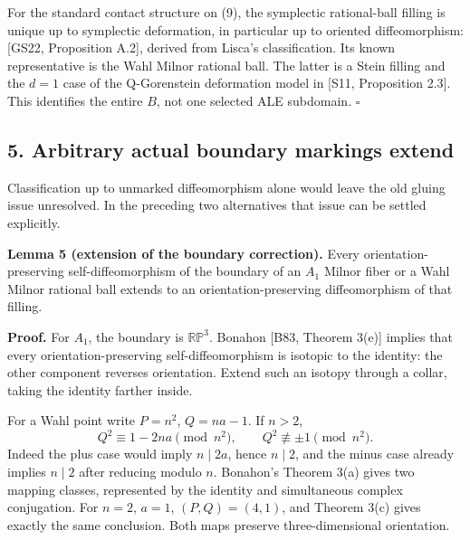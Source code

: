 \documentclass[
  11pt,
]{article}
\begin{document}
For the standard contact structure on (9), the symplectic rational-ball
filling is unique up to symplectic deformation, in particular up to
oriented diffeomorphism: {[}GS22, Proposition A.2{]}, derived from
Lisca's classification. Its known representative is the Wahl Milnor
rational ball. The latter is a Stein filling and the \(d=1\) case of the
Q-Gorenstein deformation model in {[}S11, Proposition 2.3{]}. This
identifies the entire \(B\), not one selected ALE subdomain. \(\square\)

\hypertarget{arbitrary-actual-boundary-markings-extend}{%
\subsection{5. Arbitrary actual boundary markings
extend}\label{arbitrary-actual-boundary-markings-extend}}

Classification up to unmarked diffeomorphism alone would leave the old
gluing issue unresolved. In the preceding two alternatives that issue
can be settled explicitly.

\textbf{Lemma 5 (extension of the boundary correction).} Every
orientation-preserving self-diffeomorphism of the boundary of an \(A_1\)
Milnor fiber or a Wahl Milnor rational ball extends to an
orientation-preserving diffeomorphism of that filling.

\textbf{Proof.} For \(A_1\), the boundary is \(\mathbb{RP}^3\). Bonahon
{[}B83, Theorem 3(e){]} implies that every orientation-preserving
self-diffeomorphism is isotopic to the identity: the other component
reverses orientation. Extend such an isotopy through a collar, taking
the identity farther inside.

For a Wahl point write \(P=n^2\), \(Q=na-1\). If \(n>2\), \[
 Q^2\equiv1-2na\pmod{n^2},\qquad Q^2\not\equiv\pm1\pmod{n^2}.
                                                                    \tag{10}
\] Indeed the plus case would imply \(n\mid2a\), hence \(n\mid2\), and
the minus case already implies \(n\mid2\) after reducing modulo \(n\).
Bonahon's Theorem 3(a) gives two mapping classes, represented by the
identity and simultaneous complex conjugation. For \(n=2\), \(a=1\),
\((P,Q)=(4,1)\), and Theorem 3(c) gives exactly the same conclusion.
Both maps preserve three-dimensional orientation.
\end{document}
